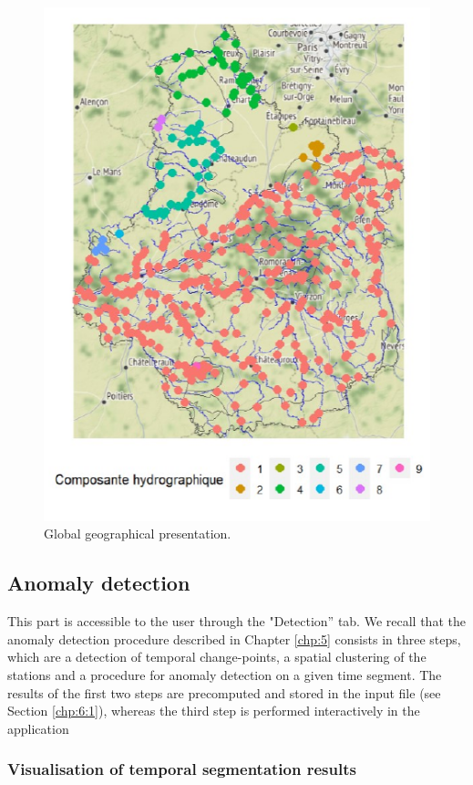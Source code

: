 \begin{figure}[htbp]
  \centering
  \includegraphics{figs/Chap6/Im_app2.pdf}
  \caption{Global geographical presentation.}
  \label{fig:Imapp2}
\end{figure}

\subsection{Anomaly detection}\label{chp:6:2:2}

This part is accessible to the user through the "Detection” tab. We recall that the anomaly detection procedure described in Chapter \ref{chp:5} consists in three steps, which are a detection of temporal change-points, a spatial clustering of the stations and a procedure for anomaly detection on a given time segment. The results of the first two steps are precomputed and stored in the input file (see Section \ref{chp:6:1}), whereas the third step is performed interactively in the application

\subsubsection{Visualisation of temporal segmentation results}\label{chp:6:2:temp}

